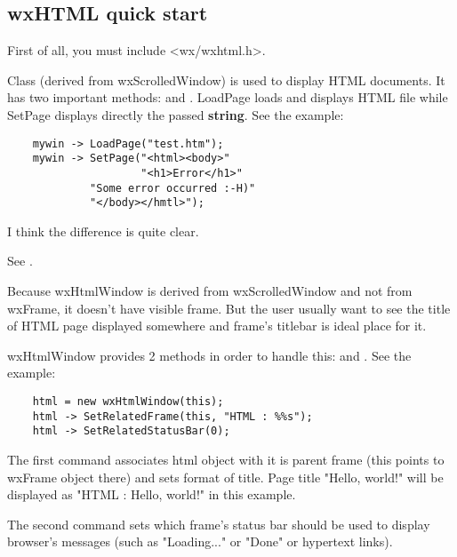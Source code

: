 \subsection{wxHTML quick start}\label{wxhtmlquickstart}


First of all, you must include <wx/wxhtml.h>.

Class  (derived from wxScrolledWindow)
is used to display HTML documents.
It has two important methods:  
and .
LoadPage loads and displays HTML file while SetPage displays directly the
passed {\bf string}. See the example:

\begin{verbatim}
    mywin -> LoadPage("test.htm");
    mywin -> SetPage("<html><body>"
                     "<h1>Error</h1>"
		     "Some error occurred :-H)"
		     "</body></hmtl>");
\end{verbatim}

I think the difference is quite clear.


See .


Because wxHtmlWindow is derived from wxScrolledWindow and not from
wxFrame, it doesn't have visible frame. But the user usually want to see
the title of HTML page displayed somewhere and frame's titlebar is 
ideal place for it.

wxHtmlWindow provides 2 methods in order to handle this: 
 and 
. 
See the example:

\begin{verbatim}
    html = new wxHtmlWindow(this);
    html -> SetRelatedFrame(this, "HTML : %%s");
    html -> SetRelatedStatusBar(0);
\end{verbatim}

The first command associates html object with it is parent frame
(this points to wxFrame object there) and sets format of title.
Page title "Hello, world!" will be displayed as "HTML : Hello, world!"
in this example.

The second command sets which frame's status bar should be used to display
browser's messages (such as "Loading..." or "Done" or hypertext links).

